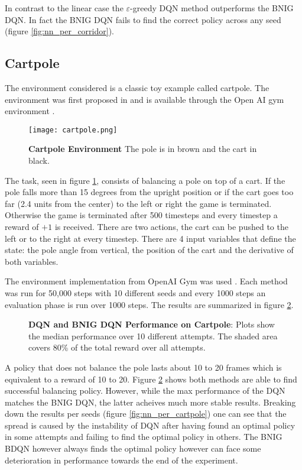 In contrast to the linear case the $\varepsilon$-greedy DQN method outperforms the BNIG DQN. In fact the BNIG DQN fails to find the correct policy across any seed (figure \ref{fig:nn_per_corridor}).


\subsection{Cartpole}

The environment considered is a classic toy example called cartpole. The environment was first proposed in \cite{barto_sutton_1983} and is available through the Open AI gym environment \citep{brockman_2016}.

\begin{figure}[H]
    \centering
    \texttt{[image: cartpole.png]}
    \caption{\textbf{Cartpole Environment} The pole is in brown and the cart in black. \citep{gym_docs}}
    \label{fig:cartpole}
\end{figure}

The task, seen in figure \ref{fig:cartpole}, consists of balancing a pole on top of a cart. If the pole falls more than 15 degrees from the upright position or if the cart goes too far (2.4 units from the center) to the left or right the game is terminated. Otherwise the game is terminated after 500 timesteps and every timestep a reward of $+1$ is received. There are two actions, the cart can be pushed to the left or to the right at every timestep. There are 4 input variables that define the state: the pole angle from vertical, the position of the cart and the derivative of both variables. 

The environment implementation from OpenAI Gym was used \citep{brockman_2016}. Each method was run for 50,000 steps with 10 different seeds and every 1000 steps an evaluation phase is run over 1000 steps. The results are summarized in figure \ref{fig:nn_cartpole}.

\begin{figure}[H]
    \centering
    \caption{\textbf{DQN and BNIG DQN Performance on Cartpole}: Plots show the median performance over 10 different attempts. The shaded area covers 80\% of the total reward over all attempts.}
    \label{fig:nn_cartpole}
\end{figure}

A policy that does not balance the pole lasts about 10 to 20 frames which is equivalent to a reward of 10 to 20. Figure \ref{fig:nn_cartpole} shows both methods are able to find successful balancing policy. However, while the max performance of the DQN matches the BNIG DQN, the latter acheives much more stable results. Breaking down the results per seeds (figure \ref{fig:nn_per_cartpole}) one can see that the spread is caused by the instability of DQN after having found an optimal policy in some attempts and failing to find the optimal policy in others. The BNIG BDQN however always finds the optimal policy however can face some deterioration in performance towards the end of the experiment. 

